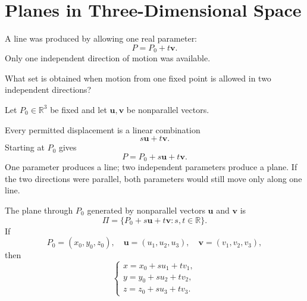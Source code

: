 \section{Planes in Three-Dimensional Space}

A line was produced by allowing one real parameter:
\[
P=P_0+t\mathbf v.
\]
Only one independent direction of motion was available.

\begin{corebox}
What set is obtained when motion from one fixed point is allowed in two
independent directions?
\end{corebox}

Let $P_0\in\mathbb R^3$ be fixed and let $\mathbf u,\mathbf v$ be nonparallel
vectors.

\begin{derivationbox}
Every permitted displacement is a linear combination
\[
s\mathbf u+t\mathbf v.
\]
Starting at $P_0$ gives
\[
P=P_0+s\mathbf u+t\mathbf v.
\]
One parameter produces a line; two independent parameters produce a plane. If
the two directions were parallel, both parameters would still move only along
one line.
\end{derivationbox}

\begin{definitionbox}
The plane through $P_0$ generated by nonparallel vectors $\mathbf u$ and
$\mathbf v$ is
\[
\boxed{
\Pi=\{P_0+s\mathbf u+t\mathbf v:s,t\in\mathbb R\}
}.
\]
If
\[
P_0=(x_0,y_0,z_0),\quad
\mathbf u=(u_1,u_2,u_3),\quad
\mathbf v=(v_1,v_2,v_3),
\]
then
\[
\boxed{
\begin{cases}
x=x_0+s u_1+t v_1,\\
y=y_0+s u_2+t v_2,\\
z=z_0+s u_3+t v_3.
\end{cases}
}
\]
\end{definitionbox}

\begin{center}
\end{center}

